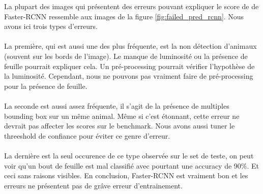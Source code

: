 La plupart des images qui présentent des erreurs pouvant expliquer le score de de Faster-RCNN ressemble aux images de la figure \ref{fig:failed_pred_rcnn}. 
Nous avons ici trois types d'erreurs. 
\paragraph{}
La première, qui est aussi une des plus fréquente, est la non détection d'animaux (souvent sur les bords de l'image). Le manque de luminosité ou la présence de feuille pourrait expliquer cela. Un pré-processing pourrait vérifier l'hypothèse de la luminosité. Cependant, nous ne pouvons pas vraiment faire de pré-processing pour la présence de feuille.
\paragraph{}
La seconde est aussi assez fréquente, il s'agit de la présence de multiples bounding box sur un même animal. Même si c'est étonnant, cette erreur ne devrait pas affecter les scores sur le benchmark. Nous avons aussi tuner le threeshold de confiance pour éviter ce genre d'erreur.
\paragraph{}
La dernière est la seul occurence de ce type observée sur le set de teste, on peut voir qu'un bout de feuille est mal classifié avec pourtant une accuracy de 90\%. Et ceci sans raisons visibles.
En conclusion, Faster-RCNN est vraiment bon et les erreurs ne présentent pas de grâve erreur d'entrainement.

